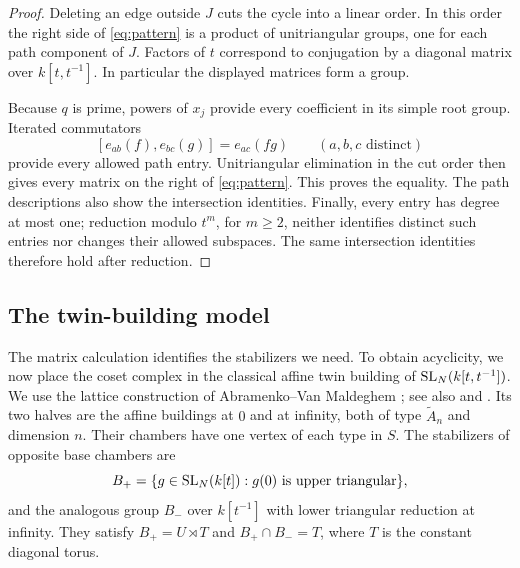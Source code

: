 \begin{proof}
Deleting an edge outside $J$ cuts the cycle into a linear order. In this
order the right side of \eqref{eq:pattern} is a product of unitriangular
groups, one for each path component of $J$. Factors of $t$ correspond to
conjugation by a diagonal matrix over $k[t,t^{-1}]$. In particular the
displayed matrices form a group.

Because $q$ is prime, powers of $x_j$ provide every coefficient in its
simple root group. Iterated commutators
\[
 [e_{ab}(f),e_{bc}(g)]=e_{ac}(fg)
 \qquad(a,b,c\text{ distinct})
\]
provide every allowed path entry. Unitriangular elimination in the cut
order then gives every matrix on the right of \eqref{eq:pattern}.
This proves the equality. The path descriptions also show the
intersection identities. Finally, every entry has degree at most one;
reduction modulo $t^m$, for $m\ge2$, neither identifies distinct such
entries nor changes their allowed subspaces. The same intersection
identities therefore hold after reduction.
\end{proof}

\subsection{The twin-building model}

The matrix calculation identifies the stabilizers we need. To obtain
acyclicity, we now place the coset complex in the classical affine
twin building of $\operatorname{SL}_N(k[t,t^{-1}])$. We use the lattice construction
of Abramenko--Van Maldeghem
\cite[Section~4, Proposition~4.4 and Remark~4.6]{AVM2001};
see also \cite[Lemma~5]{Abramenko} and
\cite{AbramenkoBrown}. Its two halves are the
affine buildings at $0$ and at infinity, both of type $\widetilde A_n$
and dimension $n$. Their chambers have one vertex of each type in $S$.
The stabilizers of opposite base chambers are
\[
 B_+=\{g\in\operatorname{SL}_N(k[t]):g(0)\text{ is upper triangular}\},
\]
and the analogous group $B_-$ over $k[t^{-1}]$ with lower triangular
reduction at infinity. They satisfy $B_+=U\rtimes T$ and
$B_+\cap B_-=T$, where $T$ is the constant diagonal torus.

